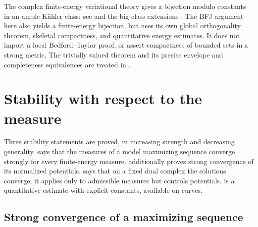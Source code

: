 \begin{remark}
\label{rem:ch28-cy-comparison}
The complex finite-energy variational theory gives a bijection modulo
constants in an ample K\"ahler class; see \cite{BBGZ13} and the big-class
extensions \cite{BEGZ10,BBEGZ16}.  The BFJ argument here also yields
a finite-energy bijection, but uses its own global orthogonality theorem,
skeletal compactness, and quantitative energy estimates.  It does not
import a local Bedford--Taylor proof, or assert compactness of bounded
sets in a strong metric.  The trivially valued theorem
\cite[Theorem~12.8]{BJ22} and its precise envelope and completeness
equivalences are treated in
.
\end{remark}

\section{Stability with respect to the measure}
\label{sec:ch28-stability}

Three stability statements are proved, in increasing strength and decreasing
generality.   says that the
measures of a model maximizing sequence converge strongly for every
finite-energy measure.   additionally
proves strong convergence of its normalized potentials.
 says that on a fixed dual complex the
solutions converge; it applies only to admissible measures but controls
potentials.   is a quantitative estimate with
explicit constants, available on curves.

\subsection{Strong convergence of a maximizing sequence}
\label{sec:ch28-maximizing-net}

